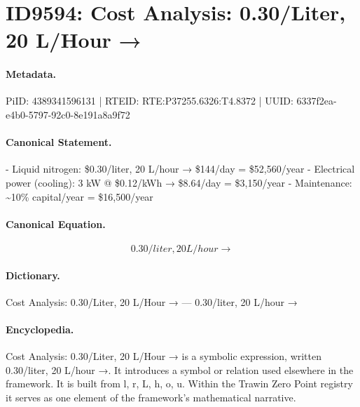 \section*{ID9594: Cost Analysis: 0.30/Liter, 20 L/Hour →}
\paragraph{Metadata.}
PiID: 4389341596131 | RTEID: RTE:P37255.6326:T4.8372 | UUID: 6337f2ea-e4b0-5797-92c0-8e191a8a9f72

\paragraph{Canonical Statement.}
- Liquid nitrogen: \$0.30/liter, 20 L/hour → \$144/day = \$52,560/year - Electrical power (cooling): 3 kW @ \$0.12/kWh → \$8.64/day = \$3,150/year - Maintenance: \textasciitilde{}10\% capital/year = \$16,500/year

\paragraph{Canonical Equation.}
\[
0.30/liter, 20 L/hour →
\]

\paragraph{Dictionary.}
Cost Analysis: 0.30/Liter, 20 L/Hour → — 0.30/liter, 20 L/hour →

\paragraph{Encyclopedia.}
Cost Analysis: 0.30/Liter, 20 L/Hour → is a symbolic expression, written 0.30/liter, 20 L/hour →. It introduces a symbol or relation used elsewhere in the framework. It is built from l, r, L, h, o, u. Within the Trawin Zero Point registry it serves as one element of the framework's mathematical narrative.
